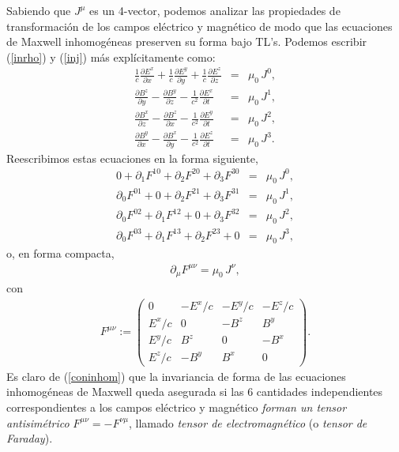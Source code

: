 Sabiendo que $J^\mu$ es un 4-vector, podemos analizar las propiedades de transformación de los campos eléctrico y magnético de modo que las ecuaciones de Maxwell inhomogéneas preserven su forma bajo TL's. Podemos escribir (\ref{inrho}) y (\ref{inj})  más explícitamente como:
\begin{eqnarray}
\frac{1}{c}\frac{\partial E^x}{\partial x} + \frac{1}{c}\frac{\partial E^y}{\partial y} + \frac{1}{c}\frac{\partial E^z}{\partial z} &=& \mu_0\, J^0 , \\
\frac{\partial B^z}{\partial y} - \frac{\partial B^y}{\partial z} - \frac{1}{c^2}\frac{\partial E^x}{\partial t} &=& \mu_0\,  J^1 , \\
\frac{\partial B^x}{\partial z} - \frac{\partial B^z}{\partial x} - \frac{1}{c^2}\frac{\partial E^y}{\partial t} &=& \mu_0\,  J^2 , \\
\frac{\partial B^y}{\partial x} - \frac{\partial B^x}{\partial y} - \frac{1}{c^2}\frac{\partial E^z}{\partial t} &=& \mu_0\,  J^3 .
\end{eqnarray}
Reescribimos estas ecuaciones en la forma siguiente,
\begin{eqnarray}
0 + \partial_1 F^{10} + \partial_2 F^{20} + \partial_3 F^{30} &=& \mu_0\,
J^0 ,\\
\partial_0 F^{01} + 0+ \partial_2 F^{21} + \partial_3 F^{31} &=& \mu_0\,
J^1 ,\\
\partial_0 F^{02} + \partial_1 F^{12} +0+ \partial_3 F^{32} &=& \mu_0\,
J^2 ,\\
\partial_0 F^{03} + \partial_1 F^{13} + \partial_2 F^{23} +0&=& \mu_0\,
J^3,
\end{eqnarray}
o, en forma compacta,
\begin{eqnarray}
\partial_\mu  F^{\mu \nu} = \mu_0\, J^\nu  , \label{coninhom}
\end{eqnarray}
con
\begin{eqnarray}
F^{\mu \nu}:=
\left(
\begin{array}{cccc}
0&-E^x/c&-E^y/c&-E^z/c\\
E^x/c&0&-B^z&B^y\\
E^y/c&B^z&0&-B^x\\
E^z/c&-B^y&B^x&0
\end{array}
\right) . \label{Fupup}
\end{eqnarray}
Es claro de (\ref{coninhom}) que la invariancia de forma de las ecuaciones inhomogéneas de Maxwell queda asegurada si las 6 cantidades independientes correspondientes a los campos eléctrico y magnético \textit{forman un tensor antisimétrico} $F^{\mu \nu}=-F^{\nu\mu}$, llamado \textit{tensor de electromagnético} (o \textit{tensor de Faraday}).

